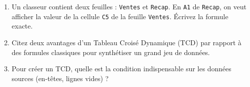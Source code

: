 \documentclass[11pt]{article}
\begin{document}
\begin{exercice}
\begin{enumerate}
    \item Un classeur contient deux feuilles : \texttt{Ventes} et \texttt{Recap}. En \texttt{A1} de \texttt{Recap}, on veut afficher la valeur de la cellule \texttt{C5} de la feuille \texttt{Ventes}. Écrivez la formule exacte.
    \item Citez deux avantages d'un Tableau Croisé Dynamique (TCD) par rapport à des formules classiques pour synthétiser un grand jeu de données.
    \item Pour créer un TCD, quelle est la condition indispensable sur les données sources (en-têtes, lignes vides) ?
\end{enumerate}
\end{exercice}
\end{document}
